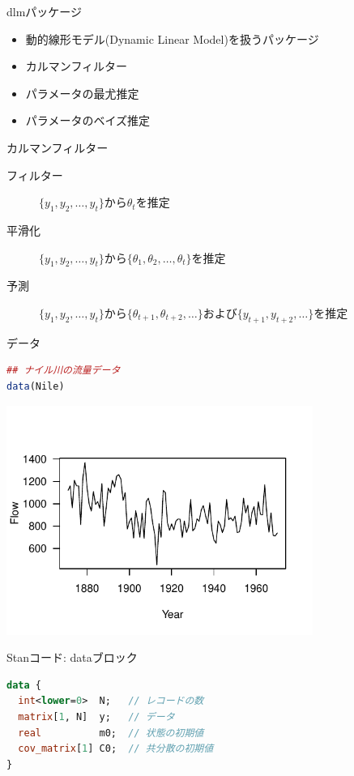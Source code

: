 \documentclass[dvipdfmx,12pt]{beamer}
\begin{document}
\begin{frame}{dlmパッケージ}
  \begin{itemize}
  \item 動的線形モデル(Dynamic Linear Model)を扱うパッケージ
  \item カルマンフィルター
  \item パラメータの最尤推定
  \item パラメータのベイズ推定
  \end{itemize}
\end{frame}

\begin{frame}{カルマンフィルター}
  \begin{description}
  \item[フィルター] $\{y_1,y_2,\dots,y_t\}$から$\theta_t$を推定
  \item[平滑化] $\{y_1,y_2,\dots,y_t\}$から$\{\theta_1,\theta_2,\dots,\theta_t\}$を推定
  \item[予測] $\{y_1,y_2,\dots,y_t\}$から$\{\theta_{t+1},\theta_{t+2},\dots\}$および$\{y_{t+1},y_{t+2},\dots\}$を推定
  \end{description}
\end{frame}


\begin{frame}[fragile]{データ}
  \begin{lstlisting}[language=R]
## ナイル川の流量データ
data(Nile)
  \end{lstlisting}

  \begin{center}
    \includegraphics[width=10cm]{Nile}
  \end{center}
\end{frame}

\begin{frame}[fragile]{Stanコード: dataブロック}
  \begin{lstlisting}[language=Stan]
data {
  int<lower=0>  N;   // レコードの数
  matrix[1, N]  y;   // データ
  real          m0;  // 状態の初期値
  cov_matrix[1] C0;  // 共分散の初期値
}
  \end{lstlisting}
\end{frame}
\end{document}
